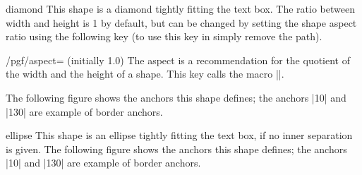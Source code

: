 \begin{shape}{diamond}
  This shape is a diamond tightly fitting the text box. The ratio
  between width and height is 1 by default, but can be changed by
  setting the shape aspect ratio using the following \pgfname{}
  key (to use this key in \tikzname{} simply remove the 
   path). 

  \begin{key}{/pgf/aspect= (initially 1.0)}
    The aspect is a recommendation for the quotient of the width and 
    the height of a shape. This key calls the macro
    |\pgfsetshapeaspect|.
  \end{key}
  
  The following figure shows the anchors this
  shape defines; the anchors |10| and |130| are example of border
  anchors.
  
\begin{codeexample}[]
\Huge
{}
\end{codeexample}
\end{shape}

\begin{shape}{ellipse}
  This shape is an ellipse tightly fitting the text box, if no inner
  separation is given. The following figure shows the anchors this
  shape defines; the anchors |10| and |130| are example of border anchors.
\begin{codeexample}[]
\Huge
{}
\end{codeexample}
\end{shape}





